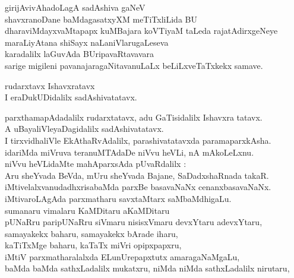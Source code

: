 \begin{entry}
\gl{}
\begin{shl}
girijAvivAhadoLagA sadAshiva gaNeV\\
shavxranoDane baMdagasatxyXM meTiTxliLida BU\\
dharaviMdayxvaMtapapx kuMBajara koVTiyaM taLeda rajatAdirxgeNeye\\
maraLiyAtana shiSayx naLaniVlarugaLeseva\\
karadalilx laGuvAda BUripavaRtavavara\\
sarige migileni pavanajaragaNitavanuLaLx beLiLxveTaTxkekx samave.
\end{shl}
\end{entry}

\begin{entry}
\begin{shl}
rudarxtavx Ishavxratavx\\
I eraDukUDidalilx sadAshivatatavx.
\end{shl}
\begin{shl}
parxthamapAdadalilx rudarxtatavx, adu GaTisidalilx Ishavxra tatavx.\\
A uBayaliVleyaDagidalilx sadAshivatatavx.\\
I tirxvidhaliVle EkAthaRvAdalilx, parashivatatavxda paramaparxkAsha.\\
idariMda miVruva teranuMTAdaDe niVvu heVLi, nA mAkoLeLxnu.\\
niVvu heVLidaMte mahAparxsAda pUvaRdalilx :\\
Aru sheYvada BeVda, mUru sheYvada Bajane, SaDadxshaRnada takaR.\\
iMtivelalxvanudadhxrisabaMda parxBe basavaNaNx cenanxbasavaNaNx.\\
iMtivaroLAgAda parxmatharu savxtaMtarx saMbaMdhigaLu.\\
sumanaru vimalaru KaMDitaru aKaMDitaru\\
pUNaRru paripUNaRru siVmaru nisisxVmaru devxYtaru adevxYtaru,\\
samayakekx baharu, samayakekx bArade iharu,\\
kaTiTxMge baharu, kaTaTx miVri opipxpapxru,\\
iMtiV parxmatharalalxda ELunUrepapxtutx amaragaNaMgaLu,\\
baMda baMda sathxLadalilx mukatxru, niMda niMda sathxLadalilx nirutaru,\\

\end{shl}
\end{entry}
